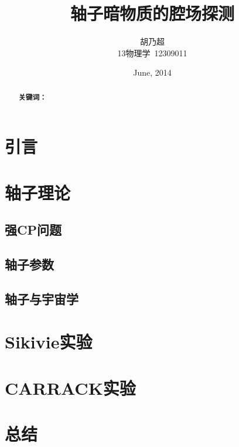 \documentclass[a4paper]{article}
\title{轴子暗物质的腔场探测}
\author{胡乃超\\13物理学\, 12309011}
\date{June, 2014}
\begin{document}
\maketitle
\begin{abstract}
\textbf{关键词：}
\end{abstract}
\section*{引言}

\section*{轴子理论}
\subsection*{强CP问题}
\subsection*{轴子参数}
\subsection*{轴子与宇宙学}

\section*{Sikivie实验}
\section*{CARRACK实验}
\section*{总结}
\end{document}
